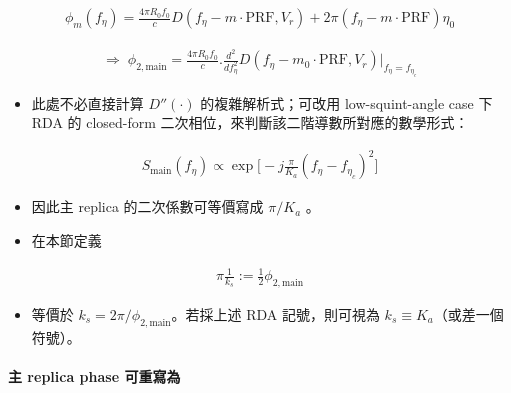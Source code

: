 \documentclass[10pt]{article}
\providecommand{\tightlist}{%
  \setlength{\itemsep}{0pt}\setlength{\parskip}{0pt}}
\begin{document}
\begin{equation}
\begin{aligned}
\phi_m(f_\eta)=\frac{4\pi R_0f_0}{c}D(f_\eta-m\cdot\mathrm{PRF},V_r)+2\pi(f_\eta-m\cdot\mathrm{PRF})\eta_0
\end{aligned}
\end{equation}

\begin{equation}
\begin{aligned}
\Rightarrow\;
\phi_{2,\mathrm{main}} =
\frac{4\pi R_0f_0}{c}
\biggl.
\frac{d^2}{df_\eta^2}D(f_\eta-m_0\cdot\mathrm{PRF},V_r)
\biggr|_{f_\eta=f_{\eta_c}}
\end{aligned}
\end{equation}

\begin{itemize}
\tightlist
\item
  此處不必直接計算 \(D''(\cdot)\) 的複雜解析式；可改用 low-squint-angle
  case 下 RDA 的 closed-form
  二次相位，來判斷該二階導數所對應的數學形式：
\end{itemize}

\begin{equation}
\begin{aligned}
S_{\mathrm{main}}(f_\eta)\propto
\exp\biggl[-j\frac{\pi}{K_a}(f_\eta-f_{\eta_c})^2\biggr]
\end{aligned}
\end{equation}

\begin{itemize}
\item
  因此主 replica 的二次係數可等價寫成 \(\pi/K_a\) 。
\item
  在本節定義
\end{itemize}

\begin{equation}
\begin{aligned}
\pi\frac{1}{k_s}:=\frac{1}{2}\phi_{2,\mathrm{main}}
\end{aligned}
\end{equation}

\begin{itemize}
\tightlist
\item
  等價於 \(k_s=2\pi/\phi_{2,\mathrm{main}}\)。若採上述 RDA
  記號，則可視為 \(k_s\equiv K_a\)（或差一個符號）。
\end{itemize}

\hypertarget{ux4e3b-replica-phase-ux53efux91cdux5bebux70ba}{%
\paragraph{主 replica phase
可重寫為}\label{ux4e3b-replica-phase-ux53efux91cdux5bebux70ba}}
\end{document}
